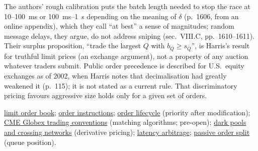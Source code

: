 \begin{qfmechanism}
The authors' rough calibration puts the batch length needed to stop the race at 10--100~ms or 100~ms--1~s depending on the meaning of $\delta$ (p.~1606, from an online appendix), which they call ``at best'' a sense of magnitudes; random message delays, they argue, do not address sniping (sec.~VIII.C, pp.~1610--1611). Their surplus proposition, ``trade the largest $Q$ with $b_Q\ge s_Q$'', is Harris's result for truthful limit prices (an exchange argument), not a property of any auction whatever traders submit. Public order precedence is described for U.S.\ equity exchanges as of 2002, when Harris notes that decimalisation had greatly weakened it (p.~115); it is not stated as a current rule. That discriminatory pricing favours aggressive size holds only for a given set of orders.

 \hyperref[def:limit-order-book]{limit order book}; \hyperref[def:order-instructions]{order instructions}; \hyperref[mech:order-lifecycle]{order lifecycle} (priority after modification); \hyperref[conv:cme-globex-trading]{CME Globex trading conventions} (matching algorithms; pre-open); \hyperref[def:dark-pools-crossing]{dark pools and crossing networks} (derivative pricing); \hyperref[res:latency-arbitrage-arms-race]{latency arbitrage}; \hyperref[meth:passive-order-split]{passive order split} (queue position).

\end{qfmechanism}

